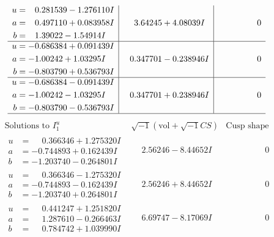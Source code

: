 \documentclass[1p]{elsarticle_modified}
\theoremstyle{definition}
\newcommand{\I}{\sqrt{-1}}
\begin{document}
$$\begin{array}{c|c|c}
\begin{aligned}
u &= \phantom{-}0.281539 - 1.276110 I \\
a &= \phantom{-}0.497110 + 0.083958 I \\
b &= \phantom{-}1.39022 - 1.54914 I\end{aligned}
 & \phantom{-}3.64245 + 4.08039 I & \phantom{-0.000000 } 0 \\ \hline\begin{aligned}
u &= -0.686384 + 0.091439 I \\
a &= -1.00242 + 1.03295 I \\
b &= -0.803790 + 0.536793 I\end{aligned}
 & \phantom{-}0.347701 - 0.238946 I & \phantom{-0.000000 } 0 \\ \hline\begin{aligned}
u &= -0.686384 - 0.091439 I \\
a &= -1.00242 - 1.03295 I \\
b &= -0.803790 - 0.536793 I\end{aligned}
 & \phantom{-}0.347701 + 0.238946 I & \phantom{-0.000000 } 0\\
 \hline 
 \end{array}$$\newpage$$\begin{array}{c|c|c}  
\text{Solutions to }I^u_{1}& \I (\text{vol} + \sqrt{-1}CS) & \text{Cusp shape}\\
 \hline 
\begin{aligned}
u &= \phantom{-}0.366346 + 1.275320 I \\
a &= -0.744893 + 0.162439 I \\
b &= -1.203740 - 0.264801 I\end{aligned}
 & \phantom{-}2.56246 - 8.44652 I & \phantom{-0.000000 } 0 \\ \hline\begin{aligned}
u &= \phantom{-}0.366346 - 1.275320 I \\
a &= -0.744893 - 0.162439 I \\
b &= -1.203740 + 0.264801 I\end{aligned}
 & \phantom{-}2.56246 + 8.44652 I & \phantom{-0.000000 } 0 \\ \hline\begin{aligned}
u &= \phantom{-}0.441247 + 1.251820 I \\
a &= \phantom{-}1.287610 - 0.266463 I \\
b &= \phantom{-}0.784742 + 1.039990 I\end{aligned}
 & \phantom{-}6.69747 - 8.17069 I & \phantom{-0.000000 } 0 \\ \hline\begin{aligned}

\end{aligned}
\end{array}$$
\end{document}
